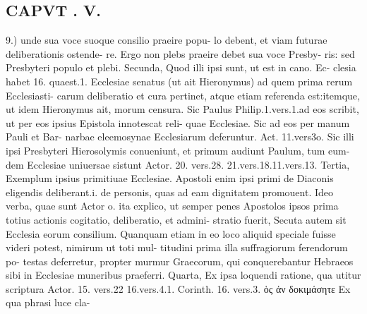 \documentclass{article}
\begin{document}
\begin{pages}
\section*{CAPVT . V. }
\marginpar{[ p.353 ]}9.) unde sua voce suoque consilio praeire popu- lo debent, et viam futurae deliberationis ostende- re. Ergo non plebs praeire debet sua voce Presby- ris: sed Presbyteri populo et plebi. Secunda, Quod illi ipsi sunt, ut est in cano. Ec- clesia habet 16. quaest.1. Ecclesiae senatus (ut ait Hieronymus) ad quem prima rerum Ecclesiasti- carum deliberatio et cura pertinet, atque etiam referenda est:itemque, ut idem Hieronymus ait, morum censura. Sic Paulus Philip.1.vers.1.ad eos scribit, ut per eos ipsius Epistola innotescat reli- quae Ecclesiae. Sic ad eos per manum Pauli et Bar- narbae eleemosynae Ecclesiarum deferuntur. Act. 11.vers3o. Sic illi ipsi Presbyteri Hierosolymis conueniunt, et primum audiunt Paulum, tum eum- dem Ecclesiae uniuersae sistunt Actor. 20. vers.28. 21.vers.18.11.vers.13. Tertia, Exemplum ipsius primitiuae Ecclesiae. Apostoli enim ipsi primi de Diaconis eligendis deliberant.i. de personis, quas ad eam dignitatem promouent. Ideo verba, quae sunt Actor o. ita explico, ut semper penes Apostolos ipsos prima totius actionis cogitatio, deliberatio, et admini- stratio fuerit, Secuta autem sit Ecclesia eorum consilium. Quanquam etiam in eo loco aliquid speciale fuisse videri potest, nimirum ut toti mul- titudini prima illa suffragiorum ferendorum po- testas deferretur, propter murmur Graecorum, qui conquerebantur Hebraeos sibi in Ecclesiae muneribus praeferri. Quarta, Ex ipsa loquendi ratione, qua utitur scriptura Actor. 15. vers.22 16.vers.4.1. Corinth. 16. vers.3. ὁς ἀν δοκιμάσητε Ex qua phrasi luce cla- 

\end{pages}
\end{document}
